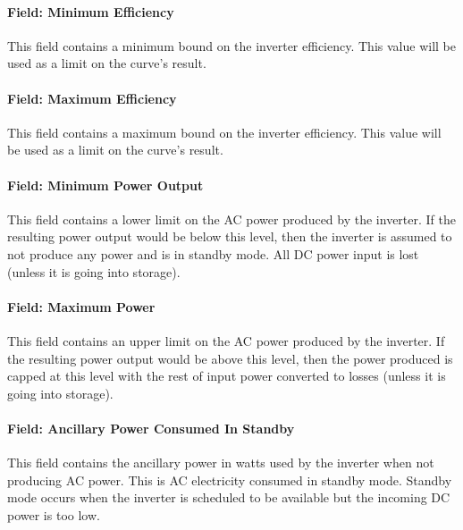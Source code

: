 \paragraph{Field: Minimum Efficiency}\label{field-minimum-efficiency}

This field contains a minimum bound on the inverter efficiency. This value will be used as a limit on the curve's result.

\paragraph{Field: Maximum Efficiency}\label{field-maximum-efficiency}

This field contains a maximum bound on the inverter efficiency. This value will be used as a limit on the curve's result.

\paragraph{Field: Minimum Power Output}\label{field-minimum-power-output}

This field contains a lower limit on the AC power produced by the inverter. If the resulting power output would be below this level, then the inverter is assumed to not produce any power and is in standby mode. All DC power input is lost (unless it is going into storage).

\paragraph{Field: Maximum Power}\label{field-maximum-power}

This field contains an upper limit on the AC power produced by the inverter. If the resulting power output would be above this level, then the power produced is capped at this level with the rest of input power converted to losses (unless it is going into storage).

\paragraph{Field: Ancillary Power Consumed In Standby}\label{field-ancillary-power-consumed-in-standby}

This field contains the ancillary power in watts used by the inverter when not producing AC power. This is AC electricity consumed in standby mode. Standby mode occurs when the inverter is scheduled to be available but the incoming DC power is too low.

